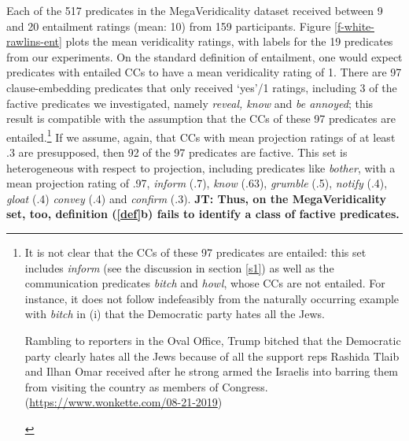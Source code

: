 \documentclass[11pt,fleqn]{article}
\newcommand{\6}{\mbox{$[\hspace*{-.6mm}[$}}
\newcommand{\9}{\mbox{$]\hspace*{-.6mm}]$}}
\newcommand{\jt}[1]{\textbf{\color{blue}JT: #1}}
\begin{document}
Each of the 517 predicates in the MegaVeridicality dataset received between 9 and 20 entailment ratings (mean: 10) from 159 participants. Figure \ref{f-white-rawlins-ent} plots the mean veridicality ratings, with labels for the 19 predicates from our experiments. On the standard definition of entailment, one would expect predicates with entailed CCs to have a mean veridicality rating of 1. There are 97 clause-embedding predicates that only received `yes'/1 ratings, including 3 of the factive predicates we investigated, namely {\em reveal, know} and {\em be annoyed}; this result is compatible with the assumption that the CCs of these 97 predicates are entailed.\footnote{\label{mv}It is not clear that the CCs of these 97 predicates are entailed: this set includes {\em inform} (see the discussion in section \ref{s1}) as well as the communication predicates {\em bitch} and {\em howl}, whose CCs are not entailed. 
For instance, it does not follow indefeasibly from the naturally occurring example with {\em bitch} in (i) that the Democratic party hates all the Jews.
\begin{exe}
 Rambling to reporters in the Oval Office, Trump bitched that the Democratic party clearly hates all the Jews because of all the support reps Rashida Tlaib and Ilhan Omar received after he strong armed the Israelis into barring them from visiting the country as members of Congress. (\url{https://www.wonkette.com/08-21-2019})
\end{exe}
}
If we assume, again, that CCs with mean projection ratings of at least .3 are presupposed, then 92 of the 97 predicates are factive. This set is heterogeneous with respect to projection, including predicates like {\em bother}, with a mean projection rating of .97, {\em inform} (.7), {\em know} (.63), {\em grumble} (.5), {\em notify} (.4), {\em gloat} (.4) {\em convey} (.4) and {\em confirm} (.3). \jt{Thus, on the MegaVeridicality set, too, definition (\ref{def}b) fails to identify a class of factive predicates. }
 
\end{document}
